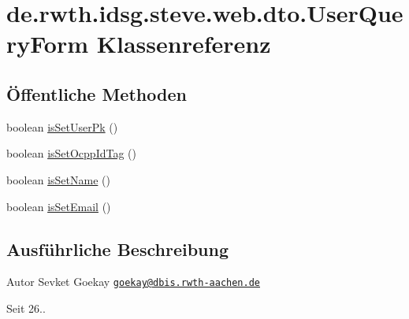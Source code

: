 \hypertarget{classde_1_1rwth_1_1idsg_1_1steve_1_1web_1_1dto_1_1_user_query_form}{\section{de.\-rwth.\-idsg.\-steve.\-web.\-dto.\-User\-Query\-Form Klassenreferenz}
\label{classde_1_1rwth_1_1idsg_1_1steve_1_1web_1_1dto_1_1_user_query_form}
}
\subsection*{Öffentliche Methoden}
\begin{DoxyCompactItemize}
\item 
boolean \hyperlink{classde_1_1rwth_1_1idsg_1_1steve_1_1web_1_1dto_1_1_user_query_form_ac956d9ab14e2083c418e2ba59e5d5e85}{is\-Set\-User\-Pk} ()
\item 
boolean \hyperlink{classde_1_1rwth_1_1idsg_1_1steve_1_1web_1_1dto_1_1_user_query_form_a5826f0ebb1613167be281f5d42aafbfe}{is\-Set\-Ocpp\-Id\-Tag} ()
\item 
boolean \hyperlink{classde_1_1rwth_1_1idsg_1_1steve_1_1web_1_1dto_1_1_user_query_form_a951e82aded99ca9f461fcbba4d31d5b9}{is\-Set\-Name} ()
\item 
boolean \hyperlink{classde_1_1rwth_1_1idsg_1_1steve_1_1web_1_1dto_1_1_user_query_form_ac92b8b53a02b3f0c1e6a84111fb0a3b1}{is\-Set\-Email} ()
\end{DoxyCompactItemize}


\subsection{Ausführliche Beschreibung}
\begin{DoxyAuthor}{Autor}
Sevket Goekay \href{mailto:goekay@dbis.rwth-aachen.de}{\tt goekay@dbis.\-rwth-\/aachen.\-de} 
\end{DoxyAuthor}
\begin{DoxySince}{Seit}
26.. 
\end{DoxySince}


